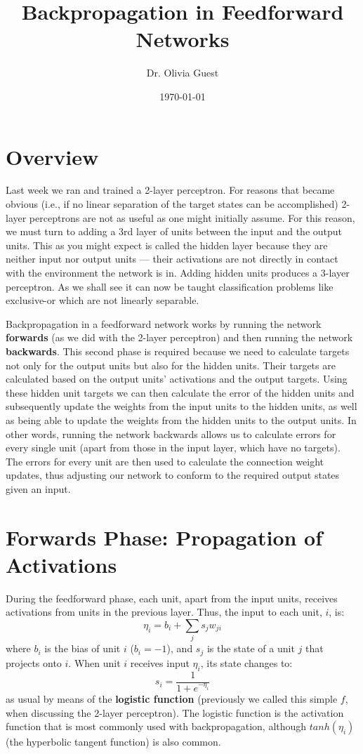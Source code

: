 \documentclass[a4paper,10pt]{article}
\title{Backpropagation in Feedforward Networks}
\author{Dr. Olivia Guest}
\date{\today}
\begin{document}
\maketitle
\section{Overview}
Last week we ran and trained a 2-layer perceptron. For reasons that became obvious (i.e., if no linear separation of the target states can be accomplished) 2-layer perceptrons are not as useful as one might initially assume. For this reason, we must turn to adding a 3rd layer of units between the input and the output units. This as you might expect is called the hidden layer because they are neither input nor output units --- their activations are not directly in contact with the environment the network is in. Adding hidden units produces a 3-layer perceptron. As we shall see it can now be taught classification problems like exclusive-or which are not linearly separable.

Backpropagation in a feedforward network works by running the network \textbf{forwards} (as we did with the 2-layer perceptron) and then running the network \textbf{backwards}. This second phase is required because we need to calculate targets not only for the output units but also for the hidden units. Their targets are calculated based on the output units' activations and the output targets. Using these hidden unit targets we can then calculate the error of the hidden units and subsequently update the weights from the input units to the hidden units, as well as being able to update the weights from the hidden units to the output units. In other words, running the network backwards allows us to calculate errors for every single unit (apart from those in the input layer, which have no targets).  The errors for every unit are then used to calculate the connection weight updates, thus adjusting our network to conform to the required output states given an input.

\section{Forwards Phase: Propagation of Activations}
During the feedforward phase, each unit, apart from the input units, receives activations from units in the previous layer. Thus, the input to each unit, $i$, is:
\begin{equation}
\label{eq:ff_eta}
 \eta_{i}= b_i + \sum_{j} s_jw_{ji}
\end{equation}
where $b_i$ is the bias of unit $i$ ($b_i = -1$), and $s_j$ is the state of a unit $j$ that projects onto $i$.
When unit $i$ receives input $\eta_{i}$, its state changes to:
\begin{equation}
\label{eq:logistic}
  s_i = \frac{1}{1 + e^{-\eta_{i}}}
\end{equation}
as usual by means of the \textbf{logistic function} (previously we called this simple $f$, when discussing the 2-layer perceptron). The logistic function is the activation function that is most commonly used with backpropagation, although $tanh(\eta_i)$ (the hyperbolic tangent function) is also common. 
\end{document}
